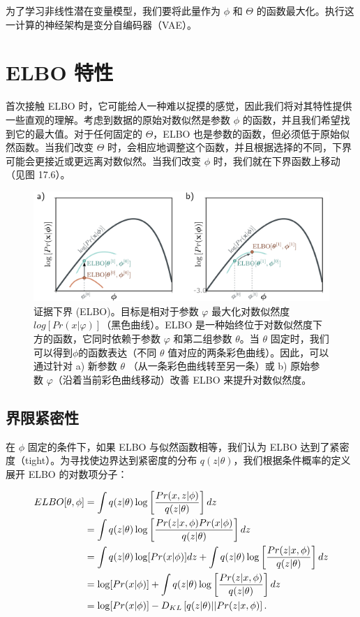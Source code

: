 为了学习非线性潜在变量模型，我们要将此量作为 \(\phi\) 和 \(\Theta\) 的函数最大化。执行这一计算的神经架构是变分自编码器（VAE）。

\section{ELBO 特性 }
首次接触 ELBO 时，它可能给人一种难以捉摸的感觉，因此我们将对其特性提供一些直观的理解。考虑到数据的原始对数似然是参数 \(\phi\) 的函数，并且我们希望找到它的最大值。对于任何固定的 \(\Theta\)，ELBO 也是参数的函数，但必须低于原始似然函数。当我们改变 \(\Theta\) 时，会相应地调整这个函数，并且根据选择的不同，下界可能会更接近或更远离对数似然。当我们改变 \(\phi\) 时，我们就在下界函数上移动（见图 17.6）。

\begin{figure}[ht!]
\centering
\includegraphics[width=0.7\linewidth]{png/chapter17/VAEELBO.png}
\caption{证据下界 (ELBO)。目标是相对于参数 \(\varphi\) 最大化对数似然度 \(log[Pr(x|\varphi)]\)（黑色曲线）。ELBO 是一种始终位于对数似然度下方的函数，它同时依赖于参数 \(\varphi\) 和第二组参数 \(\theta\)。当 \(\theta\) 固定时，我们可以得到\(\phi\)的函数表达（不同 \(\theta\) 值对应的两条彩色曲线）。因此，可以通过针对 a) 新参数  \(\theta\) （从一条彩色曲线转至另一条）或 b) 原始参数 \(\varphi\)（沿着当前彩色曲线移动）改善 ELBO 来提升对数似然度。}
\end{figure}


\subsection{界限紧密性}
在 \(\phi\) 固定的条件下，如果 ELBO 与似然函数相等，我们认为 ELBO 达到了紧密度（tight）。为寻找使边界达到紧密度的分布 \(q(z|\theta)\)，我们根据条件概率的定义展开 ELBO 的对数项分子：


\begin{align}
ELBO[\theta, \phi] &= \int q(z|\theta) \log \left[ \frac{Pr(x, z|\phi)}{q(z|\theta)} \right] dz \notag \\
&= \int q(z|\theta) \log \left[ \frac{Pr(z|x, \phi)Pr(x|\phi)}{q(z|\theta)} \right] dz \notag \\
&= \int q(z|\theta) \log [Pr(x|\phi)] dz + \int q(z|\theta) \log \left[ \frac{Pr(z|x, \phi)}{q(z|\theta)} \right] dz \notag \\
&= \log [Pr(x|\phi)] + \int q(z|\theta) \log \left[ \frac{Pr(z|x, \phi)}{q(z|\theta)} \right] dz \notag \\
&= \log [Pr(x|\phi)] - D_{KL} \left[ q(z|\theta) || Pr(z|x, \phi) \right]. 
\end{align} 


